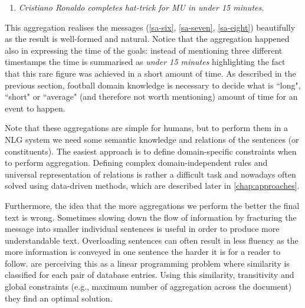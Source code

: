 \begin{enumerate}[resume]
	\item \emph{Cristiano Ronaldo completes hat-trick for MU in under 15 minutes.}
\end{enumerate}

This aggregation realises the messages (\ref{sa-six}, \ref{sa-seven}, \ref{sa-eight}) beautifully as the result is well-formed and natural. Notice that the aggregation happened also in expressing the time of the goals: instead of mentioning three different timestamps the time is summarised as \textit{under 15 minutes} highlighting the fact that this rare figure was achieved in a short amount of time. As described in the previous section, football domain knowledge is necessary to decide what is ``long", ``short" or ``average" (and therefore not worth mentioning) amount of time for an event to happen.

Note that these aggregations are simple for humans, but to perform them in a NLG system we need some semantic knowledge and relations of the sentences (or constituents). The easiest approach is to define domain-specific constraints when to perform aggregation. Defining complex domain-independent rules and universal representation of relations is rather a difficult task and nowadays often solved using data-driven methods, which are described later in \autoref{chap:approaches}. 

Furthermore, the idea that the more aggregations we perform the better the final text is wrong. Sometimes slowing down the flow of information by fracturing the message into smaller individual sentences is useful in order to produce more understandable text. Overloading sentences can often result in less fluency as the more information is conveyed in one sentence the harder it is for a reader to follow. \citet{barzilay2006aggregation} are perceiving this as a linear programming problem where similarity is classified for each pair of database entries. Using this similarity, transitivity and global constraints (e.g., maximum number of aggregation across the document) they find an optimal solution.   

